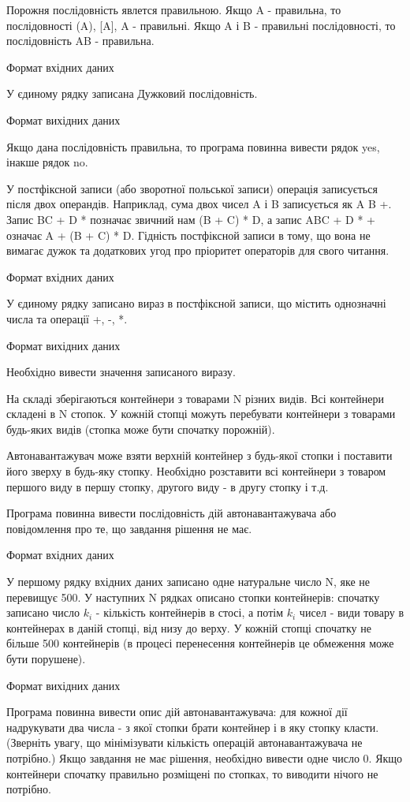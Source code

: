 \documentclass[]{article}
\begin{document}
Порожня послідовність явлется правильною. Якщо A - правильна, то послідовності (A), [A], {A} - правильні. Якщо A і B - правильні послідовності, то послідовність AB - правильна.

Формат вхідних даних

У єдиному рядку записана Дужковий послідовність.

Формат вихідних даних

Якщо дана послідовність правильна, то програма повинна вивести рядок yes, інакше рядок no.


У постфіксной записи (або зворотної польської записи) операція записується після двох операндів. Наприклад, сума двох чисел A і B записується як A B +. Запис BC + D * позначає звичний нам (B + C) * D, а запис ABC + D * + означає A + (B + C) * D. Гідність постфіксной записи в тому, що вона не вимагає дужок та додаткових угод про пріоритет операторів для свого читання.

Формат вхідних даних

У єдиному рядку записано вираз в постфіксной записи, що містить однозначні числа та операції +, -, *.

Формат вихідних даних

Необхідно вивести значення записаного виразу.


На складі зберігаються контейнери з товарами N різних видів. Всі контейнери складені в N стопок. У кожній стопці можуть перебувати контейнери з товарами будь-яких видів (стопка може бути спочатку порожній).

Автонавантажувач може взяти верхній контейнер з будь-якої стопки і поставити його зверху в будь-яку стопку. Необхідно розставити всі контейнери з товаром першого виду в першу стопку, другого виду - в другу стопку і т.д.

Програма повинна вивести послідовність дій автонавантажувача або повідомлення про те, що завдання рішення не має.

Формат вхідних даних

У першому рядку вхідних даних записано одне натуральне число N, яке не перевищує 500. У наступних N рядках описано стопки контейнерів: спочатку записано число $k_i$ - кількість контейнерів в стосі, а потім $k_i$ чисел - види товару в контейнерах в даній стопці, від низу до верху. У кожній стопці спочатку не більше 500 контейнерів (в процесі перенесення контейнерів це обмеження може бути порушене).

Формат вихідних даних

Програма повинна вивести опис дій автонавантажувача: для кожної дії надрукувати два числа - з якої стопки брати контейнер і в яку стопку класти. (Зверніть увагу, що мінімізувати кількість операцій автонавантажувача не потрібно.) Якщо завдання не має рішення, необхідно вивести одне число 0. Якщо контейнери спочатку правильно розміщені по стопках, то виводити нічого не потрібно.
\end{document}

